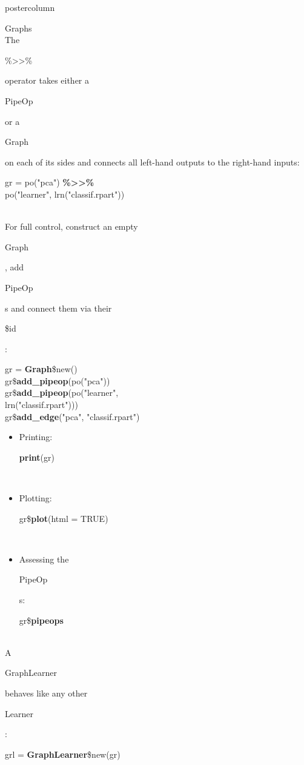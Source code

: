 \documentclass{beamer}
\newcommand{\codeinline}[1]{\begin{codeboxinline}#1\end{codeboxinline}}
\begin{document}
\begin{frame}[fragile]{}
\begin{columns}
\begin{column}{.245\textwidth}
\begin{beamercolorbox}[center]{postercolumn}
\begin{minipage}{.98\textwidth}
{\begin{myblock}{Graphs}
              \ \\
              The \codeinline{\%>{}>\%} operator takes either a \codeinline{PipeOp} or a \codeinline{Graph} on each of its sides and connects all left-hand outputs to the right-hand inputs:
              \begin{codeboxmultiline}[width=24cm]
                gr = po("pca") \textbf{\%>{}>\%}\\
                \hspace*{1ex} po("learner", lrn("classif.rpart"))
              \end{codeboxmultiline}
              \ \\
              For full control, construct an empty \codeinline{Graph}, add \codeinline{PipeOp}s and connect them via their \codeinline{\$id}:
              \begin{codeboxmultiline}[width=23cm]
                gr = \textbf{Graph}\$new()\\
                gr\$\textbf{add\_pipeop}(po("pca"))\\
                gr\$\textbf{add\_pipeop}(po("learner",\\
                \hspace*{1ex}lrn("classif.rpart")))\\
                gr\$\textbf{add\_edge}("pca", "classif.rpart")
              \end{codeboxmultiline}
              \leavevmode
              \begin{itemize}
                \item Printing: \codeinline{\textbf{print}(gr)}\\
                \item Plotting: \codeinline{gr\$\textbf{plot}(html = TRUE)}\\
                \item Assessing the \codeinline{PipeOp}s: \codeinline{gr\$\textbf{pipeops}}
              \end{itemize}
              \ \\
              A \codeinline{GraphLearner} behaves like any other \codeinline{Learner}: \codeinline{grl = \textbf{GraphLearner}\$new(gr)}\\

\end{myblock}}
\end{minipage}
\end{beamercolorbox}
\end{column}
\end{columns}
\end{frame}
\end{document}

